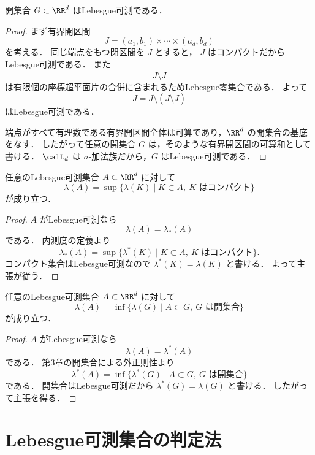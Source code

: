 \begin{theorem}[開集合]
開集合 $G\subset\RR^d$ はLebesgue可測である．
\end{theorem}
\begin{proof}
まず有界開区間
\[
J=(a_1,b_1)\times\cdots\times(a_d,b_d)
\]
を考える．
同じ端点をもつ閉区間を $\overline J$ とすると，
$\overline J$ はコンパクトだからLebesgue可測である．
また
\[
\overline J\setminus J
\]
は有限個の座標超平面片の合併に含まれるためLebesgue零集合である．
よって
\[
J=\overline J\setminus(\overline J\setminus J)
\]
はLebesgue可測である．

端点がすべて有理数である有界開区間全体は可算であり，$\RR^d$ の開集合の基底をなす．
したがって任意の開集合 $G$ は，そのような有界開区間の可算和として書ける．
$\calL_d$ は $\sigma$-加法族だから，$G$ はLebesgue可測である．
\end{proof}

\begin{theorem}[内正則性]
任意のLebesgue可測集合 $A\subset\RR^d$ に対して
\[
\lambda(A)
=
\sup\{\lambda(K)\mid K\subset A,\ K\text{ はコンパクト}\}
\]
が成り立つ．
\end{theorem}
\begin{proof}
$A$ がLebesgue可測なら
\[
\lambda(A)=\lambda_*(A)
\]
である．
内測度の定義より
\[
\lambda_*(A)
=
\sup\{\lambda^*(K)\mid K\subset A,\ K\text{ はコンパクト}\}.
\]
コンパクト集合はLebesgue可測なので $\lambda^*(K)=\lambda(K)$ と書ける．
よって主張が従う．
\end{proof}

\begin{theorem}[外正則性]
任意のLebesgue可測集合 $A\subset\RR^d$ に対して
\[
\lambda(A)
=
\inf\{\lambda(G)\mid A\subset G,\ G\text{ は開集合}\}
\]
が成り立つ．
\end{theorem}
\begin{proof}
$A$ がLebesgue可測なら
\[
\lambda(A)=\lambda^*(A)
\]
である．
第3章の開集合による外正則性より
\[
\lambda^*(A)
=
\inf\{\lambda^*(G)\mid A\subset G,\ G\text{ は開集合}\}
\]
である．
開集合はLebesgue可測だから $\lambda^*(G)=\lambda(G)$ と書ける．
したがって主張を得る．
\end{proof}

\section{Lebesgue可測集合の判定法}

